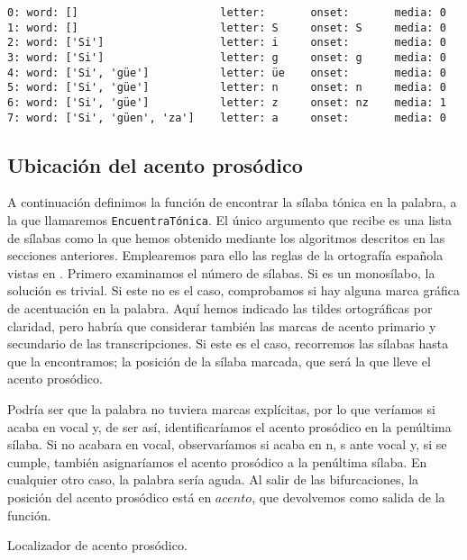 \begin{Verbatim}[fontsize=\footnotesize,xleftmargin=5ex]
0: word: []                      letter:       onset:   	media: 0
1: word: []                      letter: S     onset: S 	media: 0
2: word: ['Si']                  letter: i     onset:   	media: 0
3: word: ['Si']                  letter: g     onset: g 	media: 0
4: word: ['Si', 'güe']           letter: üe    onset:   	media: 0
5: word: ['Si', 'güe']           letter: n     onset: n 	media: 0
6: word: ['Si', 'güe']           letter: z     onset: nz	media: 1
7: word: ['Si', 'güen', 'za']    letter: a     onset:   	media: 0
\end{Verbatim}

\subsection{Ubicación del acento prosódico}
A continuación definimos la función de encontrar la sílaba tónica en la palabra, a la que llamaremos \texttt{EncuentraTónica}. El único argumento que recibe es una lista de sílabas como la que hemos obtenido mediante los algoritmos descritos en las secciones anteriores. Emplearemos para ello las reglas de la ortografía española vistas en . Primero examinamos el número de sílabas. Si es un monosílabo, la solución es trivial. Si este no es el caso, comprobamos si hay alguna marca gráfica de acentuación en la palabra. Aquí hemos indicado las tildes ortográficas por claridad, pero habría que considerar también las marcas de acento primario y secundario de las transcripciones. Si este es el caso, recorremos las sílabas hasta que la encontramos; la posición de la sílaba marcada, que será la que lleve  el acento prosódico. 

Podría ser que la palabra no tuviera marcas explícitas, por lo que veríamos si acaba en vocal y, de ser así, identificaríamos el acento prosódico en la penúltima sílaba. Si no acabara en vocal, observaríamos si acaba en \textlangle{}n\textrangle{}, \textlangle{}s\textrangle{} ante vocal y, si se cumple, también asignaríamos el acento prosódico a la penúltima sílaba. En cualquier otro caso, la palabra sería aguda. Al salir de las bifurcaciones, la posición del acento prosódico está en $acento$, que devolvemos como salida de la función.

\begin{algorithm}[!ht] %
	\caption{Localizador de acento prosódico.}\label{list:encuentracento}
\end{algorithm}


